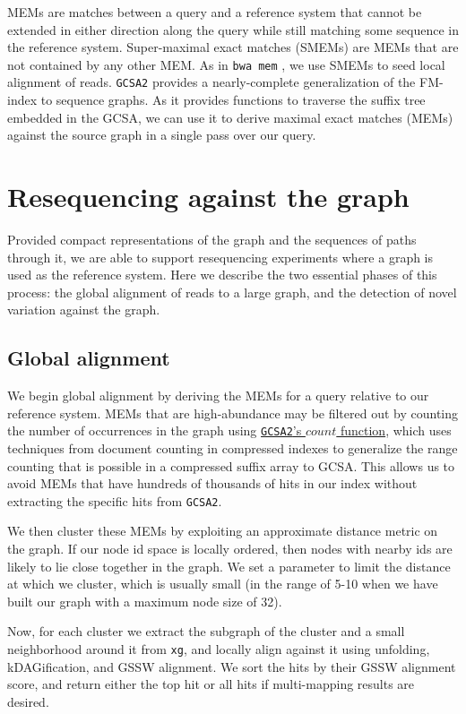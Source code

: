 \documentclass[12pt]{article}
\begin{document}
MEMs are matches between a query and a reference system that cannot be extended in either direction along the query while still matching some sequence in the reference system.
Super-maximal exact matches (SMEMs) are MEMs that are not contained by any other MEM.
As in {\tt bwa mem} \cite{li2013bwamem}, we use SMEMs to seed local alignment of reads.
{\tt GCSA2} provides a nearly-complete generalization of the FM-index to sequence graphs.
As it provides functions to traverse the suffix tree embedded in the GCSA, we can use it to derive maximal exact matches (MEMs) against the source graph in a single pass over our query.

\section{Resequencing against the graph}

Provided compact representations of the graph and the sequences of paths through it, we are able to support resequencing experiments where a graph is used as the reference system.
Here we describe the two essential phases of this process: the global alignment of reads to a large graph, and the detection of novel variation against the graph.

\subsection{Global alignment}

We begin global alignment by deriving the MEMs for a query relative to our reference system.
MEMs that are high-abundance may be filtered out by counting the number of occurrences in the graph using \href{https://github.com/jltsiren/gcsa2/releases/tag/v0.6}{{\tt GCSA2}'s $count$ function}, which uses techniques from document counting in compressed indexes to generalize the range counting that is possible in a compressed suffix array to GCSA.
This allows us to avoid MEMs that have hundreds of thousands of hits in our index without extracting the specific hits from {\tt GCSA2}.

We then cluster these MEMs by exploiting an approximate distance metric on the graph.
If our node id space is locally ordered, then nodes with nearby ids are likely to lie close together in the graph.
We set a parameter to limit the distance at which we cluster, which is usually small (in the range of 5-10 when we have built our graph with a maximum node size of 32).

Now, for each cluster we extract the subgraph of the cluster and a small neighborhood around it from {\tt xg}, and locally align against it using unfolding, kDAGification, and GSSW alignment.
We sort the hits by their GSSW alignment score, and return either the top hit or all hits if multi-mapping results are desired.
\end{document}
